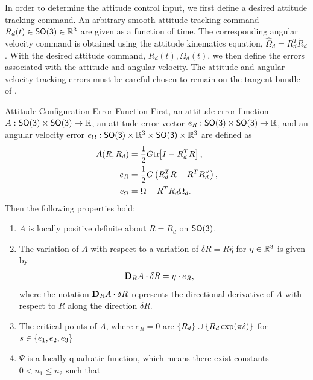 In order to determine the attitude control input, we first define a desired attitude tracking command.
An arbitrary smooth attitude tracking command \( R_d (t) \in \mathsf{SO(3)} \in \mathbb{R}^3 \) are given as a function of time.
The corresponding angular velocity command is obtained using the attitude kinematics equation, \( \hat{\Omega}_d = R_d^T \dot{R}_d \).
With the desired attitude command, \( R_d(t), \Omega_d(t) \), we then define the errors associated with the attitude and angular velocity.
The attitude and angular velocity tracking errors must be careful chosen to remain on the tangent bundle of \SO.
\begin{prop}{Attitude Configuration Error Function}\label{prop:attitude_control_configuration_error}
First, an attitude error function \(A : \mathsf{SO(3)} \times \mathsf{SO(3)}  \to \mathbb{R} \), an attitude error vector \( e_R : \mathsf{SO(3)} \times \mathsf{SO(3)} \to \mathbb{R} \), and an angular velocity error \( e_\Omega : \mathsf{SO(3)} \times \mathbb{R}^3 \times \mathsf{SO(3)} \times \mathbb{R}^3 \) are defined as
\begin{subequations}\label{eq:attitude_error_function}
\begin{align}
    A(R, R_d) &= \frac{1}{2} G \mathrm{tr}\negthickspace\left[ I - R_d^T R \right], \label{eq:A} \\
    e_R &= \frac{1}{2} G \left( R_d^T R - R^T R_d^\vee \right), \label{eq:eRA}\\
    e_\Omega &= \Omega - R^T R_d \Omega_d \label{eq:eWA}.
\end{align}
\end{subequations}
Then the following properties hold:
\begin{enumerate}
    \item \label{item:prop_A_psd} \( A \) is locally positive definite about \( R = R_d \) on \( \mathsf{SO(3)} \).
    \item \label{item:prop_eRA} The variation of \( A \) with respect to a variation of \( \delta R = R \hat{\eta} \) for \( \eta \in \mathbb{R}^3 \) is given by
	\begin{align}\label{eq:dirDiff_A}
		\mathbf{D}_{R} A \cdot \delta R &= \eta \cdot e_{R} ,
	\end{align}
	where the notation \( \mathbf{D}_{R} A \cdot \delta R \) represents the directional derivative of $A$ with respect to $R$ along the direction $\delta R$.
    \item \label{item:prop_critical_points} The critical points of \( A \), where \( e_R = 0 \) are \( \left\{ R_d \right\} \cup \left\{ R_d \exp(\pi \hat s)  \right\} \) for \( s \in \left\{ e_1, e_2, e_3 \right\}\)
    \item \label{item:prop_A_quadratic} \( \Psi \) is a locally quadratic function, which means there exist constants \( 0 < n_1 \leq n_2 \) such that

\end{enumerate}
\end{prop}
